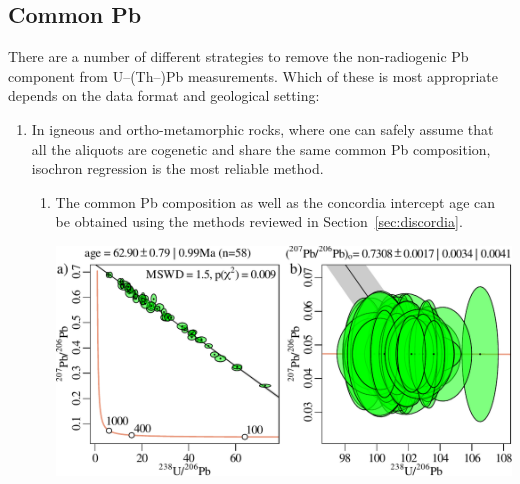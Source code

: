 \begin{refsection}
\section{Common Pb}
\label{sec:common-Pb}

There are a number of different strategies to remove the
non-radiogenic Pb component from U--(Th--)Pb measurements.  Which of
these is most appropriate depends on the data format and geological
setting:

\begin{enumerate}
\item In igneous and ortho-metamorphic rocks, where one can safely
  assume that all the aliquots are cogenetic and share the same common
  Pb composition, isochron regression is the most reliable method.
  \begin{enumerate}
  \item\label{it:isochroncommonpb} The common Pb composition as well
    as the concordia intercept age can be obtained using the methods
    reviewed in Section~\ref{sec:discordia}.

\noindent\begin{minipage}[t]{.7\linewidth}
\strut\newline
\includegraphics[width=\textwidth]{../figures/commonPbisochron13.pdf}
\end{minipage}
\noindent\begin{minipage}[t]{.3\linewidth} 
    \label{fig:commonPbisochron13}
\end{minipage}


\end{enumerate}
\end{enumerate}
\end{refsection}
